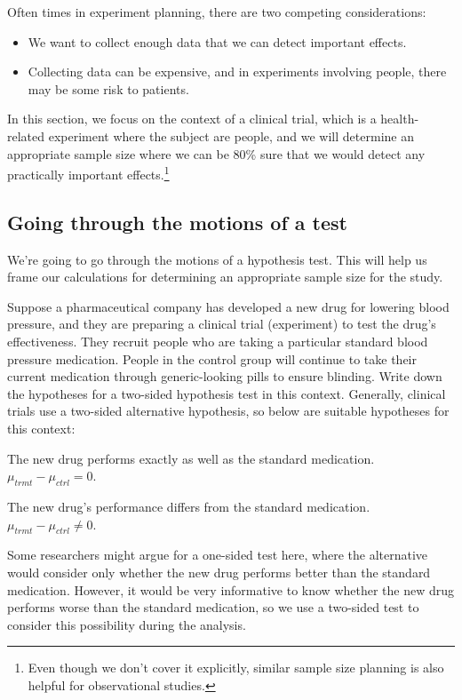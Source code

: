 \noindent%
Often times in experiment planning, there are two competing considerations:
\begin{itemize}
\setlength{\itemsep}{0mm}
\item We want to collect enough data that we can detect important effects.
\item Collecting data can be expensive, and in experiments involving people, there may be some risk to patients.
\end{itemize}
In this section, we focus on the context of a clinical trial, which is a health-related experiment where the subject are people, and we will determine an appropriate sample size where we can be 80\% sure that we would detect any practically important effects.\footnote{Even though we don't cover it explicitly, similar sample size planning is also helpful for observational studies.}


\subsection{Going through the motions of a test}

We're going to go through the motions of a hypothesis test. This will help us frame our calculations for determining an appropriate sample size for the study.

\begin{examplewrap}
\begin{nexample}{Suppose a pharmaceutical company has developed a new drug for lowering blood pressure, and they are preparing a clinical trial (experiment) to test the drug's effectiveness. They recruit people who are taking a particular standard blood pressure medication. People in the control group will continue to take their current medication through generic-looking pills to ensure blinding. Write down the hypotheses for a two-sided hypothesis test in this context.}
Generally, clinical trials use a two-sided alternative hypothesis, so below are suitable hypotheses for this context:
\begin{description}
\setlength{\itemsep}{0mm}
\item[$H_0$:] The new drug performs exactly as well as the standard medication. \\
  $\mu_{trmt} - \mu_{ctrl} = 0$.
\item[$H_A$:] The new drug's performance differs from the standard medication. \\
  $\mu_{trmt} - \mu_{ctrl} \neq 0$.
\end{description}
Some researchers might argue for a one-sided test here, where the alternative would consider only whether the new drug performs better than the standard medication. However, it would be very informative to know whether the new drug performs worse than the standard medication, so we use a two-sided test to consider this possibility during the analysis.
\end{nexample}
\end{examplewrap}

